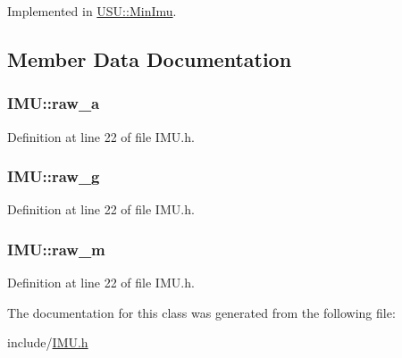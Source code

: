 \-Implemented in \hyperlink{class_u_s_u_1_1_min_imu_add98c9a8e002a56ccb4978079ac2dbfe}{\-U\-S\-U\-::\-Min\-Imu}.



\subsection{\-Member \-Data \-Documentation}
\hypertarget{class_i_m_u_acd6307b0f4f44bd6f057cd8f85080668}{
\subsubsection[{raw\-\_\-a}]{ {\bf \-I\-M\-U\-::raw\-\_\-a}}}\label{class_i_m_u_acd6307b0f4f44bd6f057cd8f85080668}


\-Definition at line 22 of file \-I\-M\-U.\-h.

\hypertarget{class_i_m_u_aa63b8395ba841c899a926fc47d4a2435}{
\subsubsection[{raw\-\_\-g}]{ {\bf \-I\-M\-U\-::raw\-\_\-g}}}\label{class_i_m_u_aa63b8395ba841c899a926fc47d4a2435}


\-Definition at line 22 of file \-I\-M\-U.\-h.

\hypertarget{class_i_m_u_ad822d0a58bd3050a42cd377453521b5f}{
\subsubsection[{raw\-\_\-m}]{ {\bf \-I\-M\-U\-::raw\-\_\-m}}}\label{class_i_m_u_ad822d0a58bd3050a42cd377453521b5f}


\-Definition at line 22 of file \-I\-M\-U.\-h.



\-The documentation for this class was generated from the following file\-:\begin{DoxyCompactItemize}
\item 
include/\hyperlink{_i_m_u_8h}{\-I\-M\-U.\-h}\end{DoxyCompactItemize}
